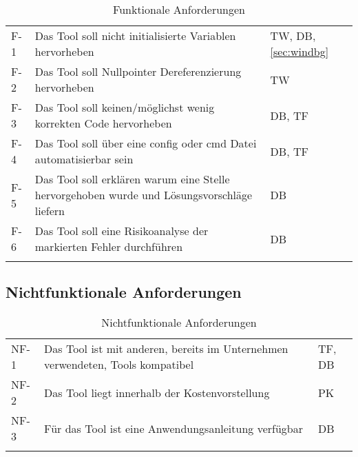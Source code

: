 \begin{longtable}{lL{10cm}l}
            \toprule
              & 
             & 
                          \\
            \midrule
            \endhead
            F-1 & 
            Das Tool soll nicht initialisierte Variablen hervorheben       & 
            TW, DB, \ref{sec:windbg} \\
            \midrule
            F-2 & 
            Das Tool soll Nullpointer Dereferenzierung hervorheben     & 
            TW                       \\
            \midrule
            F-3 & 
            Das Tool soll keinen/möglichst wenig korrekten Code hervorheben      & 
            DB, TF                   \\
            \midrule
            F-4 & 
            Das Tool soll über eine config oder cmd Datei automatisierbar sein & 
            DB, TF                   \\
            \midrule
            F-5 & 
            Das Tool soll erklären warum eine Stelle hervorgehoben wurde und Lösungsvorschläge liefern & 
            DB                       \\
            \midrule
            F-6 & 
            Das Tool soll eine Risikoanalyse der markierten Fehler durchführen& 
            DB                       \\
            \bottomrule
    \caption{Funktionale Anforderungen}
    \label{tab:funktional}
\end{longtable}

\subsection{Nichtfunktionale Anforderungen}
\label{subsec:nichtfunktional}

\begin{longtable}{lL{10cm}l}
    \toprule
      & 
     & 
                  \\
    \midrule
    \endhead
            NF-1 & Das Tool ist mit anderen, bereits im Unternehmen verwendeten, Tools kompatibel & TF, DB      \\
            \midrule
            NF-2 & Das Tool liegt innerhalb der Kostenvorstellung                                 & PK          \\
            \midrule
            NF-3 & Für das Tool ist eine Anwendungsanleitung verfügbar                            & DB          \\
            \bottomrule
        
    \caption{Nichtfunktionale Anforderungen}
    \label{tab:nichtfunktional}
\end{longtable}